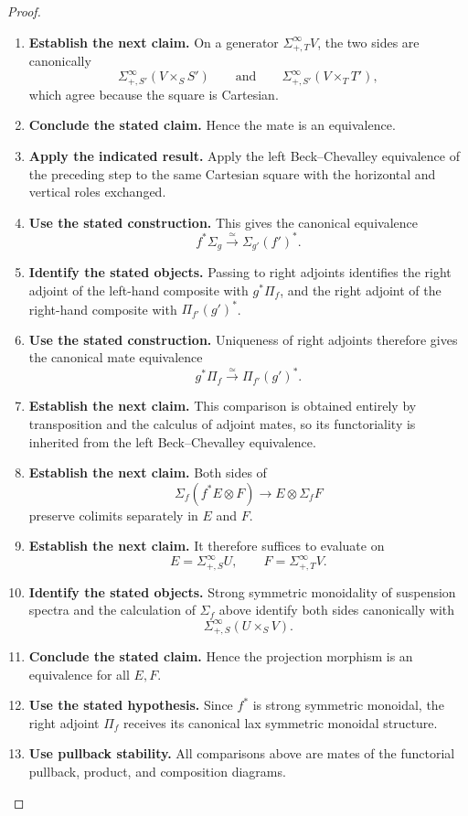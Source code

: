 \begin{proof}
\begin{enumerate}[label=\textup{(\arabic*)}]
    Suspension
    spectra of objects of the slice, together with their shifts, generate the
    stabilization.
    \item \textbf{Establish the next claim.}
    On a generator \(\Sigma^\infty_{+,T}V\), the two sides are
    canonically
    \[
    \Sigma^\infty_{+,S'}(V\times_SS')
    \qquad\text{and}\qquad
    \Sigma^\infty_{+,S'}(V\times_TT'),
    \]
    which agree because the square is Cartesian.
    \item \textbf{Conclude the stated claim.}
    Hence the mate is an equivalence.
    \item \textbf{Apply the indicated result.}
    Apply the left Beck--Chevalley equivalence of the preceding step to the same
    Cartesian square with the horizontal and vertical roles exchanged.
    \item \textbf{Use the stated construction.}
    This gives
    the canonical equivalence
    \[
    f^*\Sigma_g
    \xrightarrow{\simeq}
    \Sigma_{g'}(f')^*.
    \]
    \item \textbf{Identify the stated objects.}
    Passing to right adjoints identifies the right adjoint of the left-hand
    composite with \(g^*\Pi_f\), and the right adjoint of the right-hand composite
    with \(\Pi_{f'}(g')^*\).
    \item \textbf{Use the stated construction.}
    Uniqueness of right adjoints therefore gives the
    canonical mate equivalence
    \[
    g^*\Pi_f
    \xrightarrow{\simeq}
    \Pi_{f'}(g')^*.
    \]
    \item \textbf{Establish the next claim.}
    This comparison is obtained entirely by transposition and the calculus of
    adjoint mates, so its functoriality is inherited from the left Beck--Chevalley
    equivalence.
    \item \textbf{Establish the next claim.}
    Both sides of
    \[
    \Sigma_f(f^*E\otimes F)
    \longrightarrow
    E\otimes\Sigma_fF
    \]
    preserve colimits separately in \(E\) and \(F\).
    \item \textbf{Establish the next claim.}
    It therefore suffices to
    evaluate on
    \[
    E=\Sigma^\infty_{+,S}U,
    \qquad
    F=\Sigma^\infty_{+,T}V.
    \]
    \item \textbf{Identify the stated objects.}
    Strong symmetric monoidality of suspension spectra and the calculation of
    \(\Sigma_f\) above identify both sides canonically with
    \[
    \Sigma^\infty_{+,S}(U\times_SV).
    \]
    \item \textbf{Conclude the stated claim.}
    Hence the projection morphism is an equivalence for all \(E,F\).
    \item \textbf{Use the stated hypothesis.}
    Since \(f^*\) is strong symmetric monoidal, the right adjoint \(\Pi_f\)
    receives its canonical lax symmetric monoidal structure.
    \item \textbf{Use pullback stability.}
    All comparisons above
    are mates of the functorial pullback, product, and composition diagrams.
\end{enumerate}
\end{proof}


